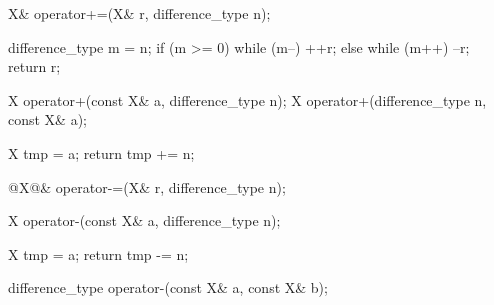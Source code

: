 \documentclass[american,twoside]{book}
\begin{document}
\color{addclr}
\begin{itemdecl}
X& operator+=(X& r, difference_type n);
\end{itemdecl}

\pnum
{}
\begin{codeblock}
{ difference_type m = n;
  if (m >= 0) while (m--) ++r;
  else while (m++) --r;
  return r; }
\end{codeblock}

\begin{itemdecl}
X operator+(const X& a, difference_type n);
X operator+(difference_type n, const X& a);
\end{itemdecl}

\pnum
{}
\begin{codeblock}
{ X tmp = a;
return tmp += n; }
\end{codeblock}

\pnum
{}

\begin{itemdecl}
@\textcolor{addclr}{X}@& operator-=(X& r, difference_type n);
\end{itemdecl}

\pnum
{}

\begin{itemdecl}
X operator-(const X& a, difference_type n);
\end{itemdecl}

\pnum
{}
\begin{codeblock}
{ X tmp = a;
  return tmp -= n; }
\end{codeblock}

\begin{itemdecl}
difference_type operator-(const X& a, const X& b);
\end{itemdecl}

\pnum
{}

\pnum
{}

\pnum
{}

\pnum
{}
\end{document}
